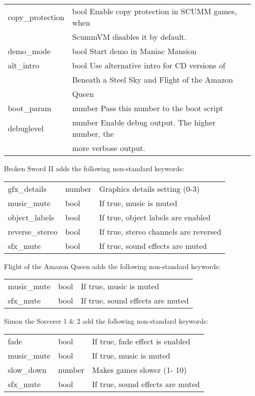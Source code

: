 \begin{tabular}[hf]{lll}
\\
        copy\_protection&bool     Enable copy protection in SCUMM games, when\\
                        &         ScummVM disables it by default.\\
        demo\_mode      &bool     Start demo in Maniac Mansion\\
        alt\_intro      &bool     Use alternative intro for CD versions of \\
                        &         Beneath a Steel Sky and Flight of the Amazon\\
                        &         Queen
\\
        boot\_param     &number   Pass this number to the boot script\\
        debuglevel      &number   Enable debug output. The higher number, the\\
                        &         more verbose output.\\
\end{tabular}

Broken Sword II adds the following non-standard keywords:\\
\begin{tabular}[h]{lll}
        gfx\_details    &number  &Graphics details setting (0-3)\\
        music\_mute     &bool    &If true, music is muted\\
        object\_labels  &bool    &If true, object labels are enabled\\
        reverse\_stereo &bool    &If true, stereo channels are reversed\\
        sfx\_mute       &bool    &If true, sound effects are muted\\
\end{tabular}

Flight of the Amazon Queen adds the following non-standard keywords:\\
\begin{tabular}[h]{lll}
        music\_mute     &bool    &If true, music is muted\\
        sfx\_mute       &bool    &If true, sound effects are muted\\
\end{tabular}

Simon the Sorcerer 1 \& 2 add the following non-standard keywords:\\
\begin{tabular}[h]{lll}
        fade            &bool    &If true, fade effect is enabled\\
        music\_mute     &bool    &If true, music is muted\\
        slow\_down      &number  &Makes games slower (1- 10)\\
        sfx\_mute       &bool    &If true, sound effects are muted\\
\end{tabular}
